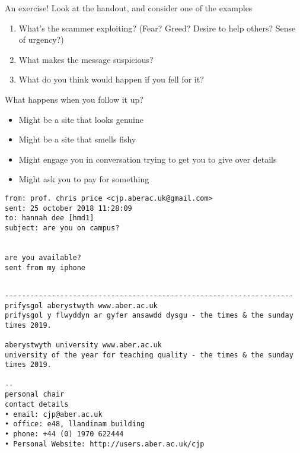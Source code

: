 \documentclass[xcolor=table]{beamer}
\begin{document}
\begin{frame}{An exercise!}
	Look at the handout, and consider one of the examples
	\begin{enumerate}
		\item What's the scammer exploiting? (Fear? Greed? Desire to help others? Sense of urgency?)
		\item What makes the message suspicious?
		\item What do you think would happen if you fell for it?
	\end{enumerate}

\end{frame}
\begin{frame}{What happens when you follow it up?}
	\begin{itemize}
		\item Might be a site that looks genuine
		\item Might be a site that smells fishy
		\item Might engage you in conversation trying to get you to give over details
		\item Might ask you to pay for something
	\end{itemize}
\end{frame}

\begin{frame}[fragile]
\begin{small}
	\begin{verbatim}
from: prof. chris price <cjp.aberac.uk@gmail.com>
sent: 25 october 2018 11:28:09
to: hannah dee [hmd1]
subject: are you on campus?
 

are you available?
sent from my iphone
	\end{verbatim}
\end{small}
\end{frame}

\begin{frame}[fragile]
\begin{small}
	\begin{verbatim}

--------------------------------------------------------------------
prifysgol aberystwyth www.aber.ac.uk
prifysgol y flwyddyn ar gyfer ansawdd dysgu - the times & the sunday times 2019.

aberystwyth university www.aber.ac.uk
university of the year for teaching quality - the times & the sunday times 2019. 

-- 
personal chair
contact details
• email: cjp@aber.ac.uk
• office: e48, llandinam building
• phone: +44 (0) 1970 622444
• Personal Website: http://users.aber.ac.uk/cjp
	\end{verbatim}
\end{small}
\end{frame}
\end{document}
